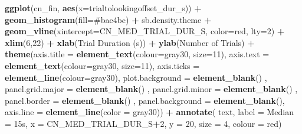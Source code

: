 \documentclass[
  doc,floatsintext]{apa6}
\newenvironment{Shaded}{\begin{snugshade}}{\end{snugshade}}
\newcommand{\AttributeTok}[1]{\textcolor[rgb]{0.13,0.29,0.53}{#1}}
\newcommand{\DecValTok}[1]{\textcolor[rgb]{0.00,0.00,0.81}{#1}}
\newcommand{\FunctionTok}[1]{\textcolor[rgb]{0.13,0.29,0.53}{\textbf{#1}}}
\newcommand{\NormalTok}[1]{#1}
\newcommand{\SpecialCharTok}[1]{\textcolor[rgb]{0.81,0.36,0.00}{\textbf{#1}}}
\newcommand{\StringTok}[1]{\textcolor[rgb]{0.31,0.60,0.02}{#1}}
\begin{document}
\begin{Shaded}
\begin{Highlighting}[]
\FunctionTok{ggplot}\NormalTok{(cn\_fin, }\FunctionTok{aes}\NormalTok{(}\AttributeTok{x=}\NormalTok{trialtolookingoffset\_dur\_s)) }\SpecialCharTok{+}
  \FunctionTok{geom\_histogram}\NormalTok{(}\AttributeTok{fill=}\StringTok{\textquotesingle{}\#bae4bc\textquotesingle{}}\NormalTok{) }\SpecialCharTok{+}
\NormalTok{  sb.density.theme }\SpecialCharTok{+}
  \FunctionTok{geom\_vline}\NormalTok{(}\AttributeTok{xintercept=}\NormalTok{CN\_MED\_TRIAL\_DUR\_S, }\AttributeTok{color=}\StringTok{\textquotesingle{}red\textquotesingle{}}\NormalTok{, }\AttributeTok{lty=}\DecValTok{2}\NormalTok{) }\SpecialCharTok{+}
  \FunctionTok{xlim}\NormalTok{(}\DecValTok{6}\NormalTok{,}\DecValTok{22}\NormalTok{) }\SpecialCharTok{+}
  \FunctionTok{xlab}\NormalTok{(}\StringTok{\textquotesingle{}Trial Duration (s)\textquotesingle{}}\NormalTok{) }\SpecialCharTok{+}
  \FunctionTok{ylab}\NormalTok{(}\StringTok{\textquotesingle{}Number of Trials\textquotesingle{}}\NormalTok{) }\SpecialCharTok{+} 
  \FunctionTok{theme}\NormalTok{(}\AttributeTok{axis.title =} \FunctionTok{element\_text}\NormalTok{(}\AttributeTok{colour=}\StringTok{\textquotesingle{}gray30\textquotesingle{}}\NormalTok{, }\AttributeTok{size=}\DecValTok{11}\NormalTok{),}
        \AttributeTok{axis.text =} \FunctionTok{element\_text}\NormalTok{(}\AttributeTok{colour=}\StringTok{\textquotesingle{}gray30\textquotesingle{}}\NormalTok{, }\AttributeTok{size=}\DecValTok{11}\NormalTok{),}
        \AttributeTok{axis.ticks =} \FunctionTok{element\_line}\NormalTok{(}\AttributeTok{colour=}\StringTok{\textquotesingle{}gray30\textquotesingle{}}\NormalTok{),}
        \AttributeTok{plot.background =} \FunctionTok{element\_blank}\NormalTok{() ,}
        \AttributeTok{panel.grid.major =} \FunctionTok{element\_blank}\NormalTok{() ,}
        \AttributeTok{panel.grid.minor =} \FunctionTok{element\_blank}\NormalTok{() ,}
        \AttributeTok{panel.border =} \FunctionTok{element\_blank}\NormalTok{() ,}
        \AttributeTok{panel.background =} \FunctionTok{element\_blank}\NormalTok{(),}
        \AttributeTok{axis.line =} \FunctionTok{element\_line}\NormalTok{(}\AttributeTok{color =} \StringTok{\textquotesingle{}gray30\textquotesingle{}}\NormalTok{)) }\SpecialCharTok{+}
  \FunctionTok{annotate}\NormalTok{(}
    \StringTok{\textquotesingle{}text\textquotesingle{}}\NormalTok{, }\AttributeTok{label =} \StringTok{\textquotesingle{}Median = 15s\textquotesingle{}}\NormalTok{,}
    \AttributeTok{x =}\NormalTok{ CN\_MED\_TRIAL\_DUR\_S}\SpecialCharTok{+}\DecValTok{2}\NormalTok{, }\AttributeTok{y =} \DecValTok{20}\NormalTok{, }\AttributeTok{size =} \DecValTok{4}\NormalTok{, }\AttributeTok{colour =} \StringTok{\textquotesingle{}red\textquotesingle{}}\NormalTok{)}
\end{Highlighting}
\end{Shaded}
\end{document}

